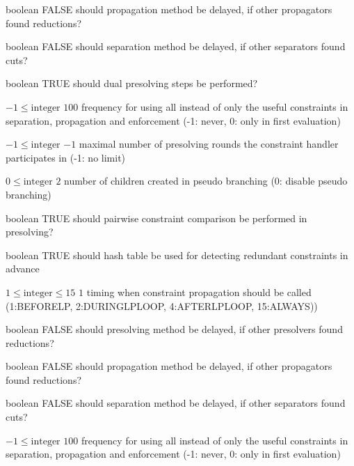 %
{boolean}%
{FALSE}%
{should propagation method be delayed, if other propagators found reductions?}%
{}

%
{boolean}%
{FALSE}%
{should separation method be delayed, if other separators found cuts?}%
{}

%
{boolean}%
{TRUE}%
{should dual presolving steps be performed?}%
{}

%
{$-1\leq\textrm{integer}$}%
{$100$}%
{frequency for using all instead of only the useful constraints in separation, propagation and enforcement (-1: never, 0: only in first evaluation)}%
{}

%
{$-1\leq\textrm{integer}$}%
{$-1$}%
{maximal number of presolving rounds the constraint handler participates in (-1: no limit)}%
{}

%
{$0\leq\textrm{integer}$}%
{$2$}%
{number of children created in pseudo branching (0: disable pseudo branching)}%
{}

%
{boolean}%
{TRUE}%
{should pairwise constraint comparison be performed in presolving?}%
{}

%
{boolean}%
{TRUE}%
{should hash table be used for detecting redundant constraints in advance}%
{}

%
{$1\leq\textrm{integer}\leq15$}%
{$1$}%
{timing when constraint propagation should be called (1:BEFORELP, 2:DURINGLPLOOP, 4:AFTERLPLOOP, 15:ALWAYS))}%
{}

%
{boolean}%
{FALSE}%
{should presolving method be delayed, if other presolvers found reductions?}%
{}

%
{boolean}%
{FALSE}%
{should propagation method be delayed, if other propagators found reductions?}%
{}

%
{boolean}%
{FALSE}%
{should separation method be delayed, if other separators found cuts?}%
{}

%
{$-1\leq\textrm{integer}$}%
{$100$}%
{frequency for using all instead of only the useful constraints in separation, propagation and enforcement (-1: never, 0: only in first evaluation)}%
{}


